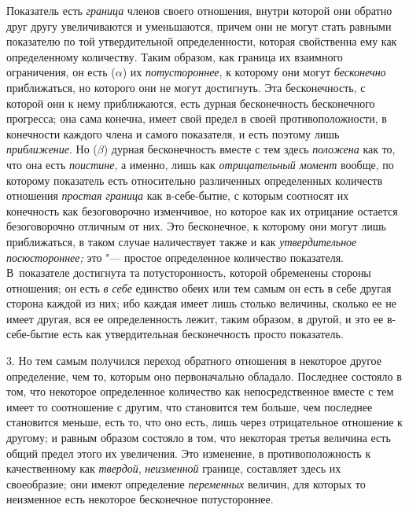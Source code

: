 Показатель есть {\em граница} членов своего отношения,
внутри которой они обратно друг другу увеличиваются и уменьшаются, причем
они не могут стать равными показателю по той утвердительной определенности,
которая свойственна ему как определенному количеству. Таким образом, как
граница их взаимного ограничения, он есть ($\alpha $) их {\em потустороннее},
к которому они могут {\em бесконечно} приближаться, но которого они не могут
достигнуть. Эта бесконечность, с которой они к нему приближаются, есть
дурная бесконечность бесконечного прогресса; она сама конечна, имеет свой
предел в своей противоположности, в конечности каждого члена и самого
показателя, и есть поэтому лишь {\em приближение}. Но
({\em $\beta $}) дурная бесконечность вместе с тем
здесь {\em положена} как то, что она есть
{\em поистине}, а именно, лишь как
{\em отрицательный момент} вообще, по которому
показатель есть относительно различенных определенных количеств отношения
{\em простая граница} как в-себе-бытие, с которым
соотносят их конечность как безоговорочно изменчивое, но которое как их
отрицание остается безоговорочно отличным от них. Это бесконечное, к
которому они могут лишь приближаться, в таком случае наличествует также и
как {\em утвердительное посюстороннее;} это "--- простое
определенное количество показателя. В~показателе достигнута та
потусторонность, которой обременены стороны отношения; он есть
{\em в себе} единство обеих или тем самым он есть в
себе другая сторона каждой из них; ибо каждая имеет лишь столько величины,
сколько ее не имеет другая, вся ее определенность лежит, таким образом, в
другой, и это ее в-себе-бытие есть как утвердительная бесконечность просто
показатель.

3. Но тем самым получился переход обратного отношения в некоторое другое
определение, чем то, которым оно первоначально обладало. Последнее состояло
в том, что некоторое определенное количество как непосредственное вместе с
тем имеет то соотношение с другим, что становится тем больше, чем последнее
становится меньше, есть то, что оно есть, лишь через отрицательное
отношение к другому; и равным образом состояло в том, что некоторая третья
величина есть общий предел этого их увеличения. Это изменение, в
противоположность к качественному как {\em твердой},
{\em неизменной} границе, составляет здесь их
своеобразие; они имеют определение {\em переменных}
величин, для которых то неизменное есть некоторое бесконечное
потустороннее.

